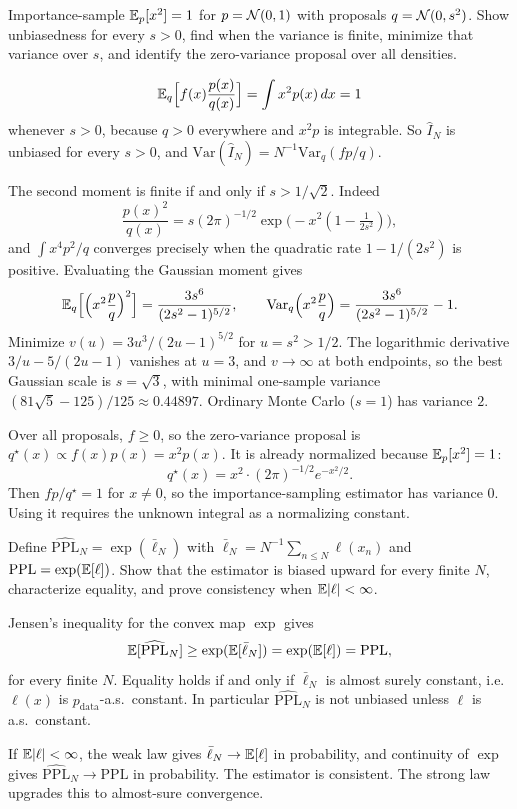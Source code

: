 \begin{hwqbox}
Importance-sample $\mathbb{E}_p[x^2]=1$ for $p=\mathcal{N}(0,1)$ with proposals $q=\mathcal{N}(0,s^2)$. Show unbiasedness for every $s>0$, find when the variance is finite, minimize that variance over $s$, and identify the zero-variance proposal over all densities.
\end{hwqbox}
\begin{hwsolbox}
\[
\mathbb{E}_q\Big[f(x)\frac{p(x)}{q(x)}\Big]=\int x^2 p(x)\,dx=1
\]
whenever $s>0$, because $q>0$ everywhere and $x^2p$ is integrable. So $\hat I_N$ is unbiased for every $s>0$, and $\mathrm{Var}(\hat I_N)=N^{-1}\mathrm{Var}_q(fp/q)$.

The second moment is finite if and only if $s>1/\sqrt 2$. Indeed
\[
\frac{p(x)^2}{q(x)}=s(2\pi)^{-1/2}\exp\big(-x^2(1-\tfrac1{2s^2})\big),
\]
and $\int x^4 p^2/q$ converges precisely when the quadratic rate $1-1/(2s^2)$ is positive. Evaluating the Gaussian moment gives
\[
\mathbb{E}_q\Big[\Big(x^2\frac pq\Big)^2\Big]=\frac{3s^6}{(2s^2-1)^{5/2}},\qquad
\mathrm{Var}_q\Big(x^2\frac pq\Big)=\frac{3s^6}{(2s^2-1)^{5/2}}-1.
\]
Minimize $v(u)=3u^3/(2u-1)^{5/2}$ for $u=s^2>1/2$. The logarithmic derivative $3/u-5/(2u-1)$ vanishes at $u=3$, and $v\to\infty$ at both endpoints, so the best Gaussian scale is $s=\sqrt 3$, with minimal one-sample variance $(81\sqrt 5-125)/125\approx 0.44897$. Ordinary Monte Carlo ($s=1$) has variance $2$.

Over all proposals, $f\ge 0$, so the zero-variance proposal is $q^\star(x)\propto f(x)p(x)=x^2 p(x)$. It is already normalized because $\mathbb{E}_p[x^2]=1$:
\[
q^\star(x)=x^2\cdot(2\pi)^{-1/2}e^{-x^2/2}.
\]
Then $fp/q^\star=1$ for $x\ne 0$, so the importance-sampling estimator has variance $0$. Using it requires the unknown integral as a normalizing constant.
\end{hwsolbox}

\begin{hwqbox}
Define $\widehat{\mathrm{PPL}}_N=\exp(\bar\ell_N)$ with $\bar\ell_N=N^{-1}\sum_{n\le N}\ell(x_n)$ and $\mathrm{PPL}=\exp(\mathbb{E}[\ell])$. Show that the estimator is biased upward for every finite $N$, characterize equality, and prove consistency when $\mathbb{E}|\ell|<\infty$.
\end{hwqbox}
\begin{hwsolbox}
Jensen's inequality for the convex map $\exp$ gives
\[
\mathbb{E}[\widehat{\mathrm{PPL}}_N]\ge\exp(\mathbb{E}[\bar\ell_N])=\exp(\mathbb{E}[\ell])=\mathrm{PPL},
\]
for every finite $N$. Equality holds if and only if $\bar\ell_N$ is almost surely constant, i.e.\ $\ell(x)$ is $p_{\mathrm{data}}$-a.s.\ constant. In particular $\widehat{\mathrm{PPL}}_N$ is not unbiased unless $\ell$ is a.s.\ constant.

If $\mathbb{E}|\ell|<\infty$, the weak law gives $\bar\ell_N\to\mathbb{E}[\ell]$ in probability, and continuity of $\exp$ gives $\widehat{\mathrm{PPL}}_N\to\mathrm{PPL}$ in probability. The estimator is consistent. The strong law upgrades this to almost-sure convergence.
\end{hwsolbox}

